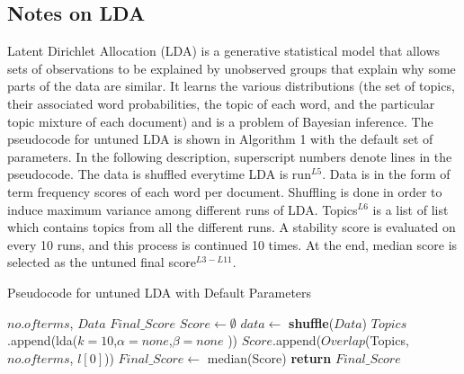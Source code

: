 \documentclass[conference]{IEEEtran}
\theoremstyle{break}
\begin{document}
\subsection{Notes on LDA}
\label{sect: LDA}
Latent Dirichlet Allocation (LDA) is a generative statistical model that allows sets of observations to be explained by unobserved groups that explain why some parts of the data are similar. It learns the various distributions (the set of topics, their associated word probabilities, the topic of each word, and the particular topic mixture of each document) and is a problem of Bayesian inference.
The pseudocode for untuned LDA is shown in Algorithm 1 with the default set of parameters. In the following description, superscript numbers denote lines in the pseudocode. The data is shuffled everytime LDA is run$^{L5}$. Data is in the form of term frequency scores of each word per document. Shuffling is done in order  to  induce  maximum  variance  among  different  runs of LDA. Topics$^{L6}$ is a list of list which contains topics from all the different runs. A stability score is evaluated on every 10 runs, and this process is continued 10 times. At the end, median score is selected as the untuned final score$^{L3-L11}$.

\makeatletter
\algrenewcommand\ALG@beginalgorithmic{\footnotesize}
\algrenewcommand{}
\makeatother
\renewcommand{\algorithmicrequire}{\textbf{Input:}}
\renewcommand{\algorithmicensure}{\textbf{Output:}}
\begin{algorithm}[!htb]
    \caption{Pseudocode for untuned LDA with Default Parameters}
    \begin{algorithmic}[1]
    \Require $no. of terms$, $Data$
    \Ensure $Final\_Score$    
        \State $Score \leftarrow \emptyset$
                \State $data \leftarrow$ \textbf{shuffle}($Data$)
                \State $Topics$.append(lda($k=10$,$\alpha=none$,$\beta=none$ ))
            \EndFor
            \State $Score$.append($Overlap$(Topics, $no. of terms$, $l[0]$))
        \EndFor
        \State $Final\_Score \leftarrow $ median(Score)
        \State \textbf{return} $Final\_Score$
    \EndFunction
    \end{algorithmic}
\end{algorithm}
\end{document}
